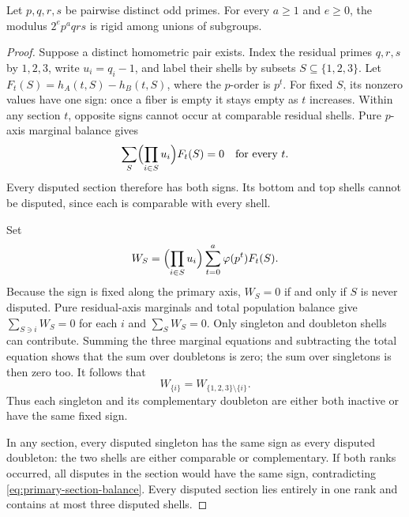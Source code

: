 \begin{theorem}
\label{thm:primary-power-four-primes}
Let \(p,q,r,s\) be pairwise distinct odd primes. For every
\(a\ge1\) and \(e\ge0\), the modulus \(2^ep^aqrs\) is rigid
among unions of subgroups.
\end{theorem}

\begin{proof}
Suppose a distinct homometric pair exists. Index the residual primes
\(q,r,s\) by \(1,2,3\), write \(u_i=q_i-1\), and label their
shells by subsets \(S\subseteq\{1,2,3\}\). Let
\(F_t(S)=h_A(t,S)-h_B(t,S)\), where the \(p\)-order is \(p^t\).
For fixed \(S\), its nonzero values have one sign: once a fiber is
empty it stays empty as \(t\) increases. Within any section \(t\),
opposite signs cannot occur at comparable residual shells.
Pure \(p\)-axis marginal balance gives
\begin{equation}
\sum_S\Bigl(\prod_{i\in S}u_i\Bigr)F_t(S)=0
\quad\hbox{for every }t.
\label{eq:primary-section-balance}
\end{equation}
Every disputed section therefore has both signs. Its bottom and top
shells cannot be disputed, since each is comparable with every shell.

Set
\[
W_S=\Bigl(\prod_{i\in S}u_i\Bigr)
       \sum_{t=0}^a\varphi(p^t)F_t(S).
\]
Because the sign is fixed along the primary axis, \(W_S=0\) if and
only if \(S\) is never disputed. Pure residual-axis marginals and
total population balance give
\(\sum_{S\ni i}W_S=0\) for each \(i\) and \(\sum_SW_S=0\).
Only singleton and doubleton shells can contribute. Summing the three
marginal equations and subtracting the total equation shows that the
sum over doubletons is zero; the sum over singletons is then zero too.
It follows that
\begin{equation}
W_{\{i\}}=W_{\{1,2,3\}\setminus\{i\}}.
\label{eq:primary-complementary-signs}
\end{equation}
Thus each singleton and its complementary doubleton are either both
inactive or have the same fixed sign.

In any section, every disputed singleton has the same sign as every
disputed doubleton: the two shells are either comparable or
complementary. If both ranks occurred, all disputes in the section
would have the same sign, contradicting
\eqref{eq:primary-section-balance}. Every disputed section lies
entirely in one rank and contains at most three disputed shells.


\end{proof}

